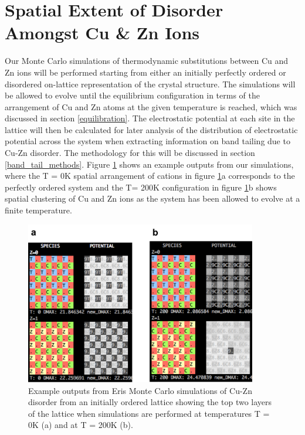 \section{Spatial Extent of Disorder Amongst Cu \& Zn Ions}
Our Monte Carlo simulations of thermodynamic substitutions between Cu and Zn ions will be performed starting from either an initially perfectly ordered or disordered on-lattice representation of the crystal structure. The simulations will be allowed to evolve until the equilibrium configuration in terms of the arrangement of Cu and Zn atoms at the given temperature is reached, which was discussed in section \ref{equilibration}. The electrostatic potential at each site in the lattice will then be calculated for later analysis of the distribution of electrostatic potential across the system when extracting information on band tailing due to Cu-Zn disorder. The methodology for this will be discussed in section \ref{band_tail_methods}. Figure \ref{eris_spatial_disorder} shows an example outputs from our simulations, where the T = 0K spatial arrangement of cations in figure \ref{eris_spatial_disorder}a corresponds to the perfectly ordered system and the T= 200K configuration in figure \ref{eris_spatial_disorder}b shows spatial clustering of Cu and Zn ions as the system has been allowed to evolve at a finite temperature.

\begin{figure}[h!]
  \centering
    \includegraphics[width=0.9\textwidth]{figures/eris_spatial_disorder.png}
    \caption{Example outputs from Eris Monte Carlo simulations of Cu-Zn disorder from an initially ordered lattice showing the top two layers of the lattice when simulations are performed at temperatures T = 0K (a) and at T = 200K (b).}
  \label{eris_spatial_disorder}
\end{figure}


